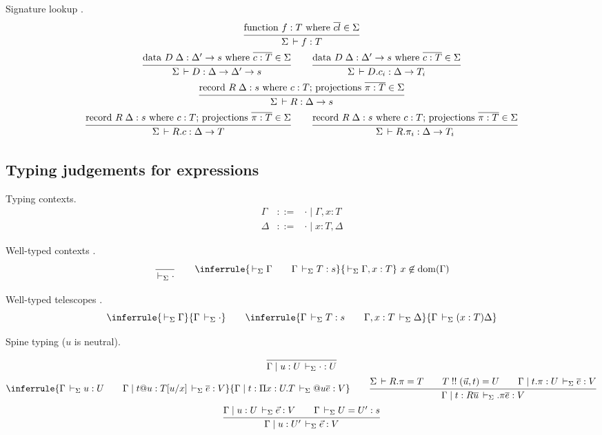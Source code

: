 \documentclass[acmlarge,fleqn]{acmart}\settopmatter{}
\begin{document}
Signature lookup .
\begin{gather*}
  \ru{\funsig \in \Sigma
    }{\Sigma \der f : T}
\\
  \ru{\datasig \in \Sigma
    }{\Sigma \der D : \Delta \to \Delta' \to s}
\qquad
  \ru{\datasig \in \Sigma
    }{\Sigma \der D.c_i : \Delta \to T_i}
\\
  \ru{\recsig \in \Sigma
    }{\Sigma \der R : \Delta \to s}
\\
  \ru{\recsig \in \Sigma
    }{\Sigma \der R.c : \Delta \to T}
\qquad
  \ru{\recsig \in \Sigma
    }{\Sigma \der R.\pi_i : \Delta \to T_i}
\end{gather*}




\subsection{Typing judgements for expressions}


Typing contexts.
\[
\begin{array}{lcl}
\Gamma & ::= & \cdot \mid \Gamma, x:T \\
\Delta & ::= & \cdot \mid x:T, \Delta
\end{array}
\]

Well-typed contexts \fbox{$\ders \Gamma$}.
\[
\ru{}{\ders \cdot}
\qquad
\inferrule
  {\ders \Gamma \qquad \Gamma \ders T:s}
  {\ders \Gamma, x : T} \ x \not\in \dom(\Gamma)
\]

Well-typed telescopes \fbox{$\Gamma \ders \Delta$}.
\[
\inferrule
  {\ders \Gamma}
  {\Gamma \ders \cdot}
\qquad
\inferrule{\Gamma \ders T : s \qquad \Gamma, x:T \ders \Delta}
{\Gamma \ders (x:T) \Delta}
\]

Spine typing 
($u$ is neutral).
\begin{gather*}
\ru{}
{\Gamma \mid u:U \ders \cdot : U}
\\
\inferrule
  {\Gamma \ders u:U \qquad \Gamma \mid t@u:T[u/x] \ders \overline{e} : V}
  {\Gamma \mid t : \Pi x:U.T \ders @u \overline{e}:V}
\qquad
\ru{\Sigma \der R.\pi = T \qquad
    T \twobang (\vec u,t) = U \qquad
    \Gamma \mid t.\pi : U \ders \overline{e} : V
  }{\Gamma \mid t :  R\overline{u}  \ders .\pi \overline{e} : V}
\\
\ru{\Gamma \mid u : U \ders \vec e : V \qquad
    \Gamma \ders U = U' : s
  }{\Gamma \mid u : U' \ders \vec e : V}
\end{gather*}
\end{document}
